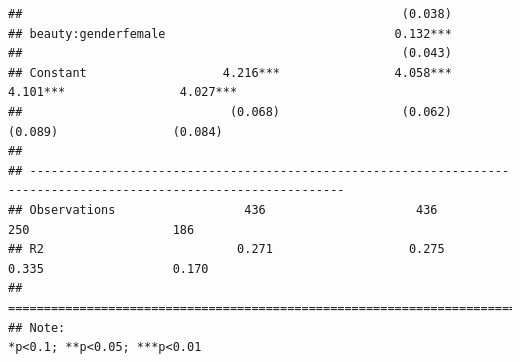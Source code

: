 \documentclass[
  shownotes,
  xcolor={svgnames},
  hyperref={colorlinks,citecolor=DarkBlue,linkcolor=DarkRed,urlcolor=DarkBlue}
  , aspectratio=169]{beamer}
\begin{document}
\begin{frame}[fragile]
\begin{tiny}
\begin{verbatim}
##                                                     (0.038)                                                       
## beauty:genderfemale                                0.132***                                                       
##                                                     (0.043)                                                       
## Constant                   4.216***                4.058***                4.101***                4.027***       
##                             (0.068)                 (0.062)                 (0.089)                (0.084)        
##                                                                                                                   
## ------------------------------------------------------------------------------------------------------------------
## Observations                  436                     436                     250                    186          
## R2                           0.271                   0.275                   0.335                  0.170         
## ==================================================================================================================
## Note:                                                                                  *p<0.1; **p<0.05; ***p<0.01
\end{verbatim}




\end{tiny}


\end{frame}
\end{document}
